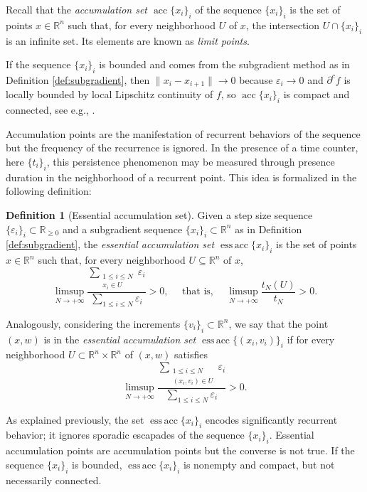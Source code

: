 \documentclass[11pt]{article}
\theoremstyle{definition}
\newtheorem{defn}[thm]{Definition}
\theoremstyle{remark}
\DeclareMathOperator{\acc}{acc}
\DeclareMathOperator{\essacc}{ess\,acc}
\newcommand{\R}{\mathbb{R}}
\renewcommand{\geq}{\geqslant}
\renewcommand{\leq}{\leqslant}
\begin{document}
Recall that the \emph{accumulation set $\acc\{x_i\}_i$} of the sequence $\{x_i\}_i$ is the set of points $x\in\R^n$ such that, for every neighborhood $U$ of $x$, the intersection $U\cap\{x_i\}_i$ is an infinite set. Its elements are known as \emph{limit points}. 

If the sequence $\{x_i\}_i$ is bounded and comes from the subgradient method as in Definition \ref{def:subgradient}, then $\|x_i-x_{i+1}\|\to 0$ because $\varepsilon_i\to 0$ and $\partial^c f$ is locally bounded by local Lipschitz continuity of $f$, so $\acc\{x_i\}_i$ is compact and connected, see e.g., \cite{bolte2014proximal}. 


\smallskip

Accumulation points are the manifestation of recurrent behaviors of the sequence but the frequency of the recurrence is ignored. In the presence of a time counter, here $\{t_i\}_i$, this persistence phenomenon  may be measured through presence duration  in the neighborhood of a recurrent point. This idea is formalized in the following definition:

\begin{defn}[Essential accumulation set]\label{def:essacc}
 Given a step size sequence $\{\varepsilon_i\}_i \subset \R_{\geq 0}$ and a subgradient sequence $\{x_i\}_i\subset\R^n$ as in Definition \ref{def:subgradient}, the \emph{essential accumulation set $\essacc\{x_i\}_i$} is the set of points $x\in\R^n$ such that, for every neighborhood $U\subseteq \R^n$ of $x$,
 \[\limsup_{N\to+\infty}\frac{\displaystyle\sum_{\substack{1\leq i\leq N\\ x_i\in U}}\varepsilon_i}{\displaystyle\sum_{1\leq i\leq N}\varepsilon_i}>0,
\quad\mbox{ that is, }\quad\limsup_{N\to+\infty}\frac{t_N(U)}{t_N}>0.\]

 Analogously, considering the increments $\{v_i\}_i \subset \R^n$, we say that the point $(x,w)$ is in the \emph{essential accumulation set $\essacc\{(x_i,v_i)\}_i$} if for every neighborhood $U\subset\R^n\times\R^n$ of $(x,w)$ satisfies
  \[\limsup_{N\to+\infty}\frac{\displaystyle\sum_{\substack{1\leq i\leq N\\ (x_i,v_i)\in U}}\varepsilon_i}{\displaystyle\sum_{1\leq i\leq N}\varepsilon_i}>0.\]
\end{defn}

As explained previously, the set $\essacc\{x_i\}_i$ encodes significantly recurrent behavior; it ignores sporadic escapades of the sequence $\{x_i\}_i$. Essential accumulation points are accumulation points but the converse is not true. If the sequence $\{x_i\}_i$ is bounded, $\essacc\{x_i\}_i$ is nonempty and compact, but not necessarily connected. %
\end{document}
